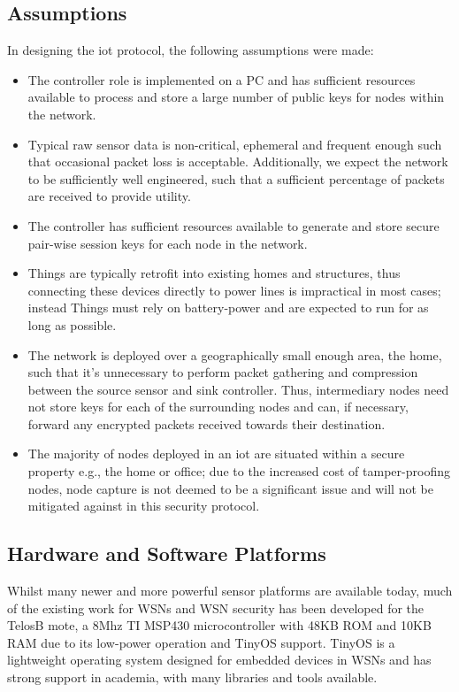 \documentclass[conference]{./sty/IEEEtran}
\begin{document}
\subsection{Assumptions} %
\label{sub:assumptions}
In designing the iot protocol, the following assumptions were made:
\begin{itemize}
  \item The controller role is implemented on a PC and has sufficient resources available to process and store a large number of public keys for nodes within the network.
  \item Typical raw sensor data is non-critical, ephemeral and frequent enough such that occasional packet loss is acceptable. Additionally, we expect the network to be sufficiently well engineered, such that a sufficient percentage of packets are received to provide utility.
  \item The controller has sufficient resources available to generate and store secure pair-wise session keys for each node in the network.
  \item Things are typically retrofit into existing homes and structures, thus connecting these devices directly to power lines is impractical in most cases; instead Things must rely on battery-power and are expected to run for as long as possible.  
  \item The network is deployed over a geographically small enough area, the home, such that it's unnecessary to perform packet gathering and compression between the source sensor and sink controller. Thus, intermediary nodes need not store keys for each of the surrounding nodes and can, if necessary, forward any encrypted packets received towards their destination.
  \item The majority of nodes deployed in an iot are situated within a secure property e.g., the home or office; due to the increased cost of tamper-proofing nodes, node capture is not deemed to be a significant issue and will not be mitigated against in this security protocol.
\end{itemize}

\subsection{Hardware and Software Platforms} %
\label{sec:hardware_and_software_platforms}
Whilst many newer and more powerful sensor platforms are available today, much of the existing work for WSNs and WSN security has been developed for the TelosB mote, a 8Mhz TI MSP430 microcontroller with 48KB ROM and 10KB RAM due to its low-power operation and TinyOS support. TinyOS is a lightweight operating system designed for embedded devices in WSNs and has strong support in academia, with many libraries and tools available. 
\end{document}
